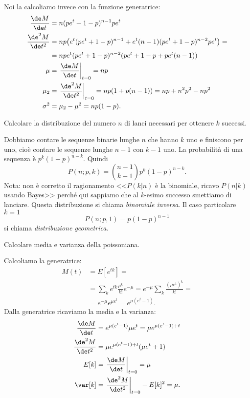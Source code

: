 Noi la calcoliamo invece con la funzione generatrice:
\begin{align*}
	\frac{\de M}{\de t} &=
	n(pe^t + 1 - p)^{n-1}pe^t \\
	\frac{\de^2 M}{\de t^2} &=
	np \big(e^t(pe^t + 1-p)^{n-1} + e^t(n-1)(pe^t+1-p)^{n-2}pe^t\big) = \\
	&= npe^t(pe^t + 1-p)^{n-2}(pe^t+1-p + pe^t(n-1)) \\
	\mu &= \left. \frac{\de M}{\de t} \right|_{t=0} = np \\
	\mu_2 &= \left. \frac{\de^2 M}{\de t^2} \right|_{t=0} = np(1 + p(n-1)) = np + n^2p^2 - np^2 \\
	\sigma^2 &= \mu_2 - \mu^2 = np(1-p).
\end{align*}

\begin{exercise}
	Calcolare la distribuzione del numero $n$ di lanci necessari per ottenere $k$ successi.
\end{exercise}

\begin{solution}
	Dobbiamo contare le sequenze binarie lunghe $n$ che hanno $k$ uno e finiscono per uno,
	cioè contare le sequenze lunghe $n-1$ con $k-1$ uno.
	La probabilità di una sequenza è $p^k(1-p)^{n-k}$.
	Quindi
	\begin{equation*}
		P(n;p,k) = \binom{n-1}{k-1} p^k(1-p)^{n-k}.
	\end{equation*}
	Nota: non è corretto il ragionamento
	<<$P(k|n)$ è la binomiale, ricavo $P(n|k)$ usando Bayes>>
	perché qui sappiamo che al $k$-esimo successo smettiamo di lanciare.
	Questa distribuzione si chiama \emph{binomiale inversa}.
	Il caso particolare $k=1$
	\begin{equation*}
		P(n;p,1) = p(1-p)^{n-1}
	\end{equation*}
	si chiama \emph{distribuzione geometrica}.
\end{solution}

\begin{exercise}
	Calcolare media e varianza della poissoniana.
\end{exercise}

\begin{solution}
	Calcoliamo la generatrice:
	\begin{align*}
		M(t) &= E[e^{tk}] = \\
		&= \sum_k e^{tk} \frac{\mu^k}{k!} e^{-\mu} =
		e^{-\mu} \sum_k \frac{(\mu e^t)^k}{k!} = \\
		&= e^{-\mu} e^{\mu e^t} = e^{\mu(e^t - 1)}.
	\end{align*}
	Dalla generatrice ricaviamo la media e la varianza:
	\begin{align*}
		\frac{\de M}{\de t} &= e^{\mu(e^t-1)}\mu e^t = \mu e^{\mu(e^t-1) + t} \\
		\frac{\de^2 M}{\de t^2} &= \mu e^{\mu(e^t-1) + t} (\mu e^t + 1) \\
		E[k] &= \left. \frac{\de M}{\de t} \right|_{t=0} = \mu \\
		\var[k] &= \left. \frac{\de^2 M}{\de t^2} \right|_{t=0} - E[k]^2 = \mu.
	\end{align*}
\end{solution}

